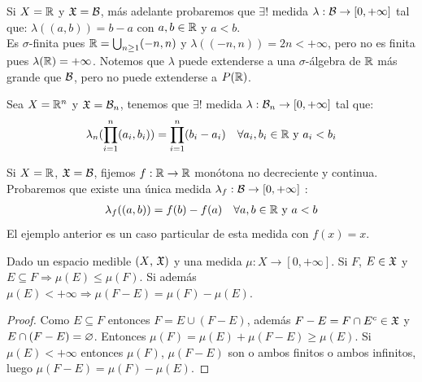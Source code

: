 \begin{eg}
    Si \(X = \mathbb{R}\) y \(\mathfrak{X} = \mathcal{B}\), más adelante probaremos que \(\exists !\) medida \(\lambda : \mathcal{B} \to [0, +\infty]\) tal que:
    \(\lambda((a, b)) = b-a\) con \(a, b \in \mathbb{R}\) y \(a < b\). \\
    Es \(\sigma\)-finita pues \(\mathbb{R} = \bigcup_{n \geq 1} (-n, n)\) y \(\lambda((-n, n)) = 2n < +\infty\), pero no es finita pues \(\lambda(\mathbb{R}) = +\infty\).
    Notemos que \(\lambda\) puede extenderse a una \(\sigma\)-álgebra de \(\mathbb{R}\) más grande que \(\mathcal{B}\), pero no puede extenderse a \(P(\mathbb{R})\).
\end{eg}

\begin{eg}
    Sea \(X = \mathbb{R}^n\) y \( \mathfrak{X} = \mathcal{B}_n\), tenemos que \(\exists!\) medida \(\lambda : \mathcal{B}_n \to [0, +\infty]\) tal que:
    \begin{align*}
        \lambda_n(\prod_{i = 1}^n (a_i, b_i)) = \prod_{i = 1}^n (b_i - a_i) \quad \forall a_i, b_i \in \mathbb{R} \text{ y } a_i < b_i
    \end{align*}
\end{eg}

\clearpage

\begin{eg}
    Si \(X = \mathbb{R}\), \(\mathfrak{X} = \mathcal{B}\), fijemos \(f: \mathbb{R} \to \mathbb{R}\) monótona no decreciente y continua. Probaremos que existe una única medida \(\lambda_f : \mathcal{B} \to [0, +\infty]\) :
    \begin{align*}
        \lambda_f((a, b)) = f(b) - f(a) \quad \forall a, b \in \mathbb{R} \text{ y } a < b
    \end{align*}
    El ejemplo anterior es un caso particular de esta medida con \(f(x) = x\).
\end{eg}

\begin{lemma}
    Dado un espacio medible \((X\text{, } \mathfrak{X})\) y una medida \(\mu : X \to [0, +\infty]\). Si \(F\), \(E \in \mathfrak{X}\) y \(E \subseteq F \Rightarrow \mu(E) \leq \mu(F)\).
    Si además \(\mu(E) < +\infty \Rightarrow \mu(F - E) = \mu(F) - \mu(E)\).
    \begin{proof}
        Como \(E \subseteq F\) entonces \(F = E \cup (F - E)\), además \(F - E = F \cap E^c \in \mathfrak{X}\) y \(E \cap (F - E) = \varnothing\).
        Entonces \(\mu(F) = \mu(E) + \mu(F - E) \geq \mu(E)\).
        Si \(\mu(E) < +\infty\) entonces \(\mu(F)\), \(\mu(F - E)\) son o ambos finitos o ambos infinitos, luego \(\mu(F - E) = \mu(F) - \mu(E)\).
    \end{proof}
\end{lemma}

